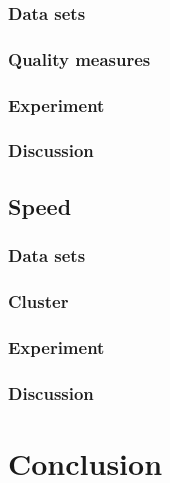 \documentclass{article}
\begin{document}
\subsubsection{Data sets}

\subsubsection{Quality measures}

\subsubsection{Experiment}

\subsubsection{Discussion}

\subsection{Speed}

\subsubsection{Data sets}

\subsubsection{Cluster}

\subsubsection{Experiment}

\subsubsection{Discussion}

\section{Conclusion}
\end{document}
